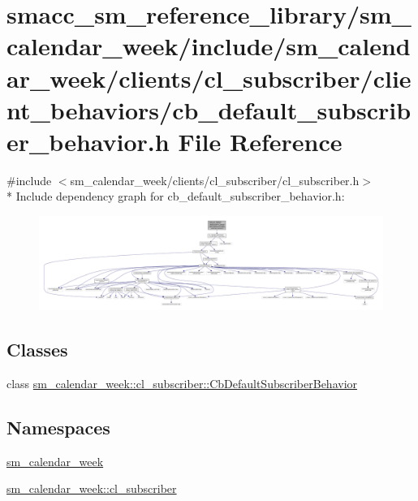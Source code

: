 \hypertarget{sm__calendar__week_2include_2sm__calendar__week_2clients_2cl__subscriber_2client__behaviors_2cb_2dd2f4ccb4741b9c6659a707c9fdb5ee}{}\section{smacc\+\_\+sm\+\_\+reference\+\_\+library/sm\+\_\+calendar\+\_\+week/include/sm\+\_\+calendar\+\_\+week/clients/cl\+\_\+subscriber/client\+\_\+behaviors/cb\+\_\+default\+\_\+subscriber\+\_\+behavior.h File Reference}
\label{sm__calendar__week_2include_2sm__calendar__week_2clients_2cl__subscriber_2client__behaviors_2cb_2dd2f4ccb4741b9c6659a707c9fdb5ee}
{\ttfamily \#include $<$sm\+\_\+calendar\+\_\+week/clients/cl\+\_\+subscriber/cl\+\_\+subscriber.\+h$>$}\\*
Include dependency graph for cb\+\_\+default\+\_\+subscriber\+\_\+behavior.\+h\+:
\nopagebreak
\begin{figure}[H]
\begin{center}
\leavevmode
\includegraphics[width=350pt]{sm__calendar__week_2include_2sm__calendar__week_2clients_2cl__subscriber_2client__behaviors_2cb_822af4dd36e2c5c4dcfbde5b77fe30ff}
\end{center}
\end{figure}
\subsection*{Classes}
\begin{DoxyCompactItemize}
\item 
class \hyperlink{classsm__calendar__week_1_1cl__subscriber_1_1CbDefaultSubscriberBehavior}{sm\+\_\+calendar\+\_\+week\+::cl\+\_\+subscriber\+::\+Cb\+Default\+Subscriber\+Behavior}
\end{DoxyCompactItemize}
\subsection*{Namespaces}
\begin{DoxyCompactItemize}
\item 
 \hyperlink{namespacesm__calendar__week}{sm\+\_\+calendar\+\_\+week}
\item 
 \hyperlink{namespacesm__calendar__week_1_1cl__subscriber}{sm\+\_\+calendar\+\_\+week\+::cl\+\_\+subscriber}
\end{DoxyCompactItemize}
